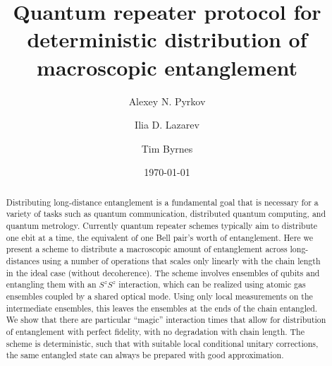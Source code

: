 \documentclass[%
  prx,%
  twocolumn,%
  preprintnumbers,%
  amsmath,%
  amssymb,%
  superscriptaddress%
]{revtex4}
\begin{document}

\title{Quantum repeater protocol for deterministic distribution of macroscopic entanglement}

\author{Alexey N. Pyrkov}


\author{Ilia D. Lazarev}

\author{Tim Byrnes}


\date{\today}%


\begin{abstract}
Distributing long-distance entanglement is a fundamental goal that is necessary for a variety of tasks such as quantum communication, distributed quantum computing, and quantum metrology.  Currently quantum repeater schemes typically  aim to distribute one ebit at a time, the equivalent of one Bell pair's worth of entanglement.  Here we present a scheme to distribute a macroscopic amount of entanglement across long-distances using a number of operations that scales only linearly with the chain length in the ideal case (without decoherence).  The scheme involves ensembles of qubits and entangling them with an $S^z S^z$ interaction, which can be realized using atomic gas ensembles coupled by a shared optical mode. Using only local measurements on the intermediate ensembles, this leaves the ensembles at the ends of the chain entangled.  We show that there are particular ``magic'' interaction times that allow for distribution of entanglement with perfect fidelity, with no degradation with chain length.  The scheme is deterministic, such that with suitable local conditional unitary corrections, the same entangled state can always be prepared with good approximation.

\end{abstract}
\end{document}
